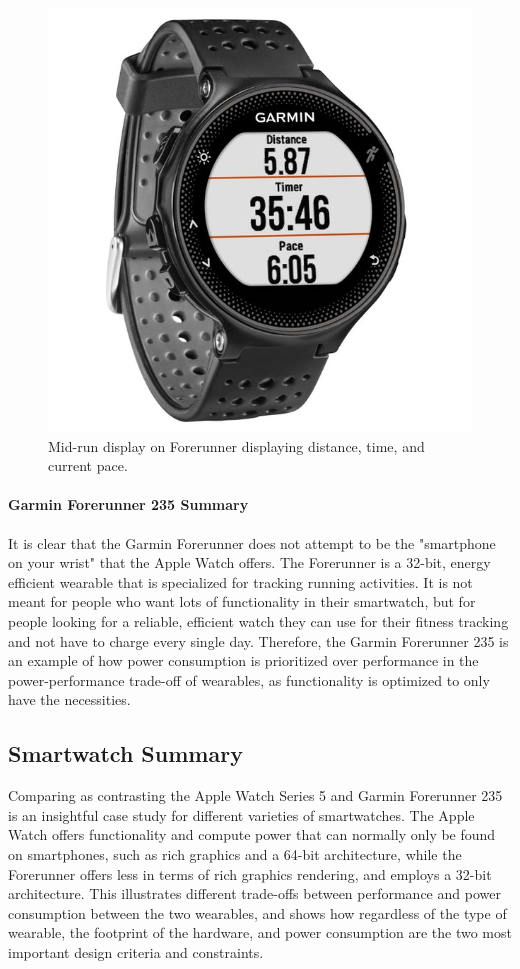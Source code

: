 \begin{figure}[h]
    \centering
    \includegraphics[scale=0.25]{media/garmin_running.jpg}
    \caption{Mid-run display on Forerunner displaying distance, time, and current pace.}
    \label{fig:garm_disp}
\end{figure}

\paragraph{Garmin Forerunner 235 Summary}
It is clear that the Garmin Forerunner does not attempt to be the "smartphone on your wrist" that the Apple
Watch offers. The Forerunner is a 32-bit, energy efficient wearable that is specialized for tracking running
activities. It is not meant for people who want lots of functionality in their smartwatch, but for people
looking for a reliable, efficient watch they can use for their fitness tracking and not have to charge every
single day. Therefore, the Garmin Forerunner 235 is an example of how power consumption is prioritized over
performance in the power-performance trade-off of wearables, as functionality is optimized to only have the
necessities.

\subsection{Smartwatch Summary}
Comparing as contrasting the Apple Watch Series 5 and Garmin Forerunner 235 is an insightful case study
for different varieties of smartwatches. The Apple Watch offers functionality and compute power 
that can normally only be found on smartphones, such as rich graphics and a 64-bit architecture, while
the Forerunner offers less in terms of rich graphics rendering, and employs a 32-bit architecture.
This illustrates different trade-offs between performance and power consumption between the 
two wearables, and shows how regardless of the type of wearable, the footprint of the hardware, and
power consumption are the two most important design criteria and constraints.